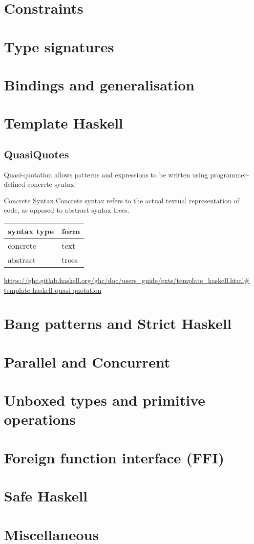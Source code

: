 \documentclass[openany, 12pt]{book}
\begin{document}
\part{Constraints}
\part{Type signatures}
\part{Bindings and generalisation}
\part{Template Haskell}

\chapter{QuasiQuotes}
Quasi-quotation allows patterns and expressions to be written using
programmer-defined concrete syntax

\begin{definition}{Concrete Syntax}{}
	Concrete syntax refers to the actual textual representation of code, as
	opposed to abstract syntax trees.
	\begin{center}
		\begin{tabular}{ll}
			\toprule
			syntax type & form  \\
			\midrule
			concrete    & text  \\
			abstract    & trees \\
			\bottomrule
		\end{tabular}
	\end{center}
\end{definition}

\url{https://ghc.gitlab.haskell.org/ghc/doc/users_guide/exts/template_haskell.html#template-haskell-quasi-quotation}

\part{Bang patterns and Strict Haskell}
\part{Parallel and Concurrent}
\part{Unboxed types and primitive operations}
\part{Foreign function interface (FFI)}
\part{Safe Haskell}
\part{Miscellaneous}
\end{document}

